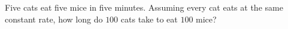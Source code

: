 Five cats eat five mice in five minutes. Assuming every cat eats at the same constant rate, how long do $100$ cats take to eat $100$ mice?
